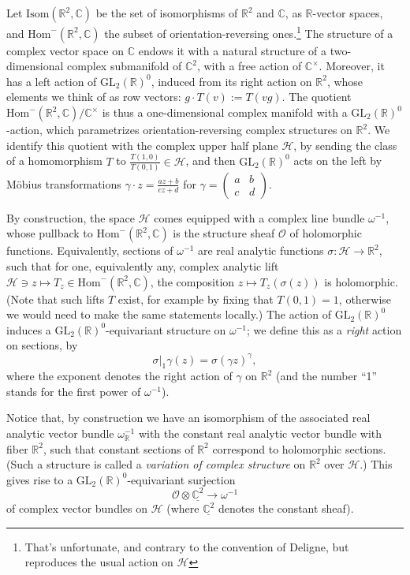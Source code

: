 Let $\text{Isom}(\mathbb R^2,\mathbb C)$ be the set of  isomorphisms of $\mathbb R^2$ and $\mathbb C$, as $\mathbb R$-vector spaces, and $\text{Hom}^-(\mathbb R^2,\mathbb C)$ the subset of orientation-reversing ones.\footnote{That's unfortunate, and contrary to the convention of Deligne, but reproduces the usual action on $\mathcal H$} The structure of a complex vector space on $\mathbb C$ endows it with a natural structure of a two-dimensional complex submanifold of $\mathbb C^2$, with a free action of $\mathbb C^\times$. Moreover, it has a left action of $\text{GL}_2(\mathbb R)^0$, induced from its right action on $\mathbb R^2$, whose elements we think of as row vectors: $g\cdot T (v):= T(vg)$. The quotient $\text{Hom}^-(\mathbb R^2,\mathbb C)/\mathbb C^\times$ is thus a one-dimensional complex manifold with a $\text{GL}_2(\mathbb R)^0$-action, which parametrizes orientation-reversing complex structures on $\mathbb R^2$. We identify this quotient with the complex upper half plane $\mathcal{H}$, by sending the class of a homomorphism $T$ to $\frac{T(1,0)}{T(0,1)} \in \mathcal H$, and then $\text{GL}_2(\mathbb R)^0$ acts on the left by M\"obius transformations $\gamma \cdot z = \frac{az+b}{cz+d}$ for $\gamma = \begin{pmatrix} a & b \\ c & d \end{pmatrix}$. 


By construction, the space $\mathcal H$ comes equipped with a complex line bundle $\omega^{-1}$, whose pullback to $\text{Hom}^-(\mathbb R^2,\mathbb C)$ is the structure sheaf $\mathcal O$ of holomorphic functions. Equivalently, sections of $\omega^{-1}$ are real analytic functions $\sigma:\mathcal H\to \mathbb R^2$, such that for one, equivalently any, complex analytic lift $\mathcal H\ni z \mapsto T_z\in \text{Hom}^-(\mathbb R^2,\mathbb C)$, the composition $z\mapsto T_z(\sigma(z))$ is holomorphic. (Note that such lifts $T$ exist, for example by fixing that $T(0,1)=1$, otherwise we would need to make the same statements locally.) The action of $\text{GL}_2(\mathbb R)^0$ induces a $\text{GL}_2(\mathbb R)^0$-equivariant structure on $\omega^{-1}$; we define this as a \emph{right} action on sections, by 
$$ \sigma|_1\gamma (z) = \sigma(\gamma z)^\gamma,$$
where the exponent denotes the right action of $\gamma$ on $\mathbb R^2$ (and the number ``1'' stands for the first power of $\omega^{-1}$).


Notice that, by construction we have an isomorphism of the associated real analytic vector bundle $\omega^{-1}_{\mathbb R}$ with the constant real analytic vector bundle with fiber $\mathbb R^2$, such that constant sections of $\mathbb R^2$ correspond to holomorphic sections. (Such a structure is called a {\it variation of complex structure} on $\mathbb{R}^{2}$ over $\mathcal H$.) This gives rise to a $\text{GL}_2(\mathbb R)^0$-equivariant surjection
\begin{equation}
 \label{equation-surjection-to-omega}
\mathcal O \otimes \underline{\mathbb C^2} \to \omega^{-1}
\end{equation}
of complex vector bundles on $\mathcal H$ (where $\underline{\mathbb C^2}$ denotes the constant sheaf).

